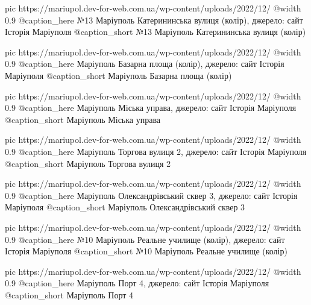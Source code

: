 	pic https://mariupol.dev-for-web.com.ua/wp-content/uploads/2022/12/%
	@width 0.9
	@caption_here №13 Маріуполь Катерининська вулиця (колір), джерело: сайт Історія Маріуполя
	@caption_short №13 Маріуполь Катерининська вулиця (колір)

	pic https://mariupol.dev-for-web.com.ua/wp-content/uploads/2022/12/%
	@width 0.9
	@caption_here Маріуполь Базарна площа (колір), джерело: сайт Історія Маріуполя
	@caption_short Маріуполь Базарна площа (колір)

	pic https://mariupol.dev-for-web.com.ua/wp-content/uploads/2022/12/%
	@width 0.9
	@caption_here Маріуполь Міська управа, джерело: сайт Історія Маріуполя
	@caption_short Маріуполь Міська управа

	pic https://mariupol.dev-for-web.com.ua/wp-content/uploads/2022/12/%
	@width 0.9
	@caption_here Маріуполь Торгова вулиця 2, джерело: сайт Історія Маріуполя
	@caption_short Маріуполь Торгова вулиця 2

	pic https://mariupol.dev-for-web.com.ua/wp-content/uploads/2022/12/%
	@width 0.9
	@caption_here Маріуполь Олександрівський сквер 3, джерело: сайт Історія Маріуполя
	@caption_short Маріуполь Олександрівський сквер 3

	pic https://mariupol.dev-for-web.com.ua/wp-content/uploads/2022/12/%
	@width 0.9
	@caption_here №10 Маріуполь Реальне училище (колір), джерело: сайт Історія Маріуполя
	@caption_short №10 Маріуполь Реальне училище (колір)

	pic https://mariupol.dev-for-web.com.ua/wp-content/uploads/2022/12/%
	@width 0.9
	@caption_here Маріуполь Порт 4, джерело: сайт Історія Маріуполя
	@caption_short Маріуполь Порт 4

